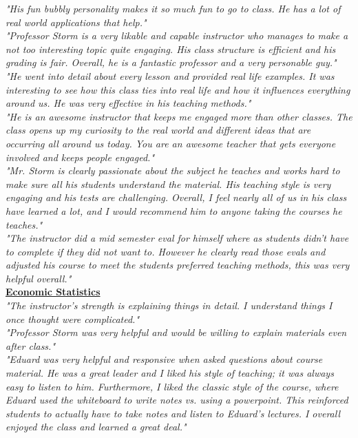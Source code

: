 \documentclass[a4paper,11pt]{article}
\begin{document}
\textit{"His fun bubbly personality makes it so much fun to go to class. He has a lot of real world applications that help."} \\

\textit{"Professor Storm is a very likable and capable instructor who manages to make a not too interesting topic quite engaging. His class structure is efficient and his grading is fair. Overall, he is a fantastic professor and a very personable guy."} \\

\textit{"He went into detail about every lesson and provided real life examples. It was interesting to see how this class ties into real life and how it influences everything around us. He was very effective in his teaching methods."} \\

\textit{"He is an awesome instructor that keeps me engaged more than other classes. The class opens up my curiosity to the real world and different ideas that are occurring all around us today. You are an awesome teacher that gets everyone involved and keeps people engaged."}  \\



\textit{"Mr. Storm is clearly passionate about the subject he teaches and works hard to make sure all his students understand the material. His teaching style is very engaging and his tests are challenging. Overall, I feel nearly all of us in his class have learned a lot, and I would recommend him to anyone taking the courses he teaches."} \\

\textit{"The instructor did a mid semester eval for himself where as students didn't have to complete if they did not want to. However he clearly read those evals and adjusted his course to meet the students preferred teaching methods, this was very helpful overall."} \\




\ul{\textbf{Economic Statistics}} \\

\textit{"The instructor's strength is explaining things in detail. I understand things I once thought were complicated."} \\

\textit{"Professor Storm was very helpful and would be willing to explain materials even after class."} \\

\textit{"Eduard was very helpful and responsive when asked questions about course material. He was a great leader and I liked his style of teaching; it was always easy to listen to him. Furthermore, I liked the classic style of the course, where Eduard used the whiteboard to write notes vs. using a powerpoint. This reinforced students to actually have to take notes and listen to Eduard's lectures. I overall enjoyed the class and learned a great deal."} \\
\end{document}
